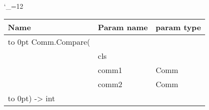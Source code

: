 \begingroup \catcode`\_=12 \tt
\begin{tabular}{lll}
\toprule
\textrm{Name}&\textrm{Param name}&\textrm{param type}\\
\midrule
\hbox to 0pt {Comm.Compare(\hss}\\
& cls\\
& comm1 & Comm\\
& comm2 & Comm\\
\hbox to 0pt{) -> int\hss}\\
\bottomrule
\end{tabular}
\endgroup
